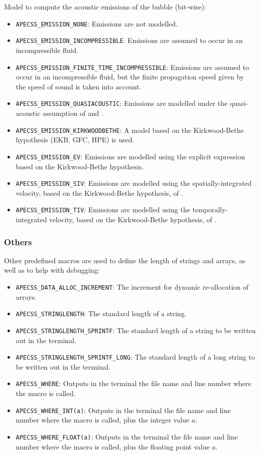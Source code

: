 Model to compute the acoustic emissions of the bubble (bit-wise):\vspace{-1em}
\begin{itemize}[noitemsep]
  \item {\tt APECSS\_EMISSION\_NONE}: Emissions are not modelled.
  \item {\tt APECSS\_EMISSION\_INCOMPRESSIBLE}: Emissions are assumed to occur in an incompressible fluid.
  \item {\tt APECSS\_EMISSION\_FINITE\_TIME\_INCOMPRESSIBLE}: Emissions are assumed to occur in an incompressible fluid, but the finite propagation speed given by the speed of sound is taken into account.
  \item {\tt APECSS\_EMISSION\_QUASIACOUSTIC}: Emissions are modelled under the quasi-acoustic assumption of \citet{Trilling1952} and \citet{Gilmore1952}.
  \item {\tt APECSS\_EMISSION\_KIRKWOODBETHE}: A model based on the Kirkwood-Bethe hypothesis (EKB, GFC, HPE) is used.
  \item {\tt APECSS\_EMISSION\_EV}: Emissions are modelled using the explicit expression based on the Kirkwood-Bethe hypothesis.
  \item {\tt APECSS\_EMISSION\_SIV}: Emissions are modelled using the spatially-integrated velocity, based on the Kirkwood-Bethe hypothesis, of \citet{Gilmore1952}.
  \item {\tt APECSS\_EMISSION\_TIV}: Emissions are modelled using the temporally-integrated velocity, based on the Kirkwood-Bethe hypothesis, of \citet{Hickling1963}.
\end{itemize}


\subsubsection{Others}

Other predefined macros are used to define the length of strings and arrays, as well as to help with debugging:\vspace{-1em}
\begin{itemize}[noitemsep]
  \item {\tt APECSS\_DATA\_ALLOC\_INCREMENT}: The increment for dynamic re-allocation of arrays.
  \item {\tt APECSS\_STRINGLENGTH}: The standard length of a string.
  \item {\tt APECSS\_STRINGLENGTH\_SPRINTF}: The standard length of a string to be written out in the terminal.
  \item {\tt APECSS\_STRINGLENGTH\_SPRINTF\_LONG}: The standard length of a long string to be  written out in the terminal.
  \item {\tt APECSS\_WHERE}: Outputs in the terminal the file name and line number where the macro is called.
  \item {\tt APECSS\_WHERE\_INT(a)}: Outputs in the terminal the file name and line number where the macro is called, plus the integer value $a$.
  \item {\tt APECSS\_WHERE\_FLOAT(a)}: Outputs in the terminal the file name and line number where the macro is called, plus the floating point value $a$.
\end{itemize}


